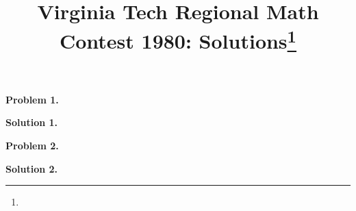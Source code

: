 \documentclass[10pt]{article}
\newcommand{\problem}[1]{\textbf{Problem #1.}}
\newcommand{\solution}[1]{\textbf{Solution #1.}}
\begin{document}
\title{Virginia Tech Regional Math Contest 1980: Solutions\footnote{\disclaimer}}
\author{\vspace{-2ex}}
\date{\vspace{-5ex}} %
\maketitle

\problem{1}


\solution{1}


\problem{2}


\solution{2}


% 
%

% 
%

% 
%

% 
%

% 
%

% 
%
\end{document}
